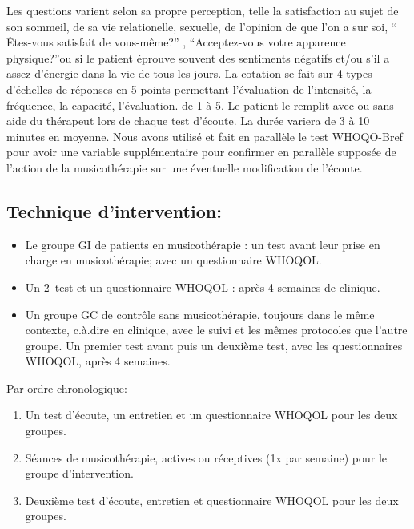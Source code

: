 Les questions varient selon sa propre perception, telle la satisfaction
au sujet de son  sommeil, de sa vie relationelle, sexuelle, de
l'opinion de que l'on a sur soi,  `` Êtes-vous satisfait de
vous-même?'' , ``Acceptez-vous votre apparence physique?''ou si le patient éprouve souvent des sentiments négatifs
et/ou s'il a assez d'énergie dans la vie de tous les jours.
La cotation se fait sur 4 types d'échelles de réponses en 5 points
permettant l'évaluation de l'intensité, la fréquence, la capacité, l'évaluation.
de 1 à 5.
Le patient le remplit avec ou sans aide du
thérapeut lors de chaque test
d'écoute. La durée variera de 3 à 10 minutes en
moyenne. 
Nous avons utilisé et fait en parallèle le test WHOQO-Bref pour avoir une variable supplémentaire pour confirmer en
parallèle supposée de l'action de la musicothérapie sur une éventuelle modification de l'écoute.


        	
        \subsection{Technique d'intervention:}


       
\begin{itemize}
	\item Le groupe GI de patients en musicothérapie : un
          test avant leur prise en charge en musicothérapie; avec un questionnaire
          WHOQOL.
          
          \item Un 2\ieme\ test et un questionnaire WHOQOL : après 4 semaines de
          clinique.
          
	\item Un groupe GC de contrôle sans musicothérapie,
	toujours dans le même contexte, c.à.dire en clinique, avec le suivi et les mêmes protocoles que l'autre groupe. Un premier test avant
 puis un deuxième test, avec les questionnaires WHOQOL, après 4 semaines. 
\end{itemize}

 Par ordre chronologique:
 
\begin{enumerate} 
        \item Un test d'écoute, un entretien et un questionnaire
          WHOQOL pour les deux groupes.
        \item Séances de musicothérapie, actives ou réceptives (1x par
          semaine) pour le groupe d'intervention.
        \item Deuxième test d'écoute, entretien et questionnaire
          WHOQOL pour les deux groupes.
\end{enumerate}

